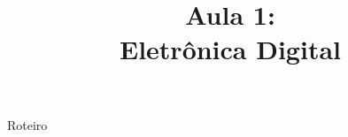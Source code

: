 


\title{Aula 1: \\ Eletrônica Digital}





\begin{frame}

	\maketitle

\end{frame}


\begin{frame}{Roteiro}

	\tableofcontents

\end{frame}








